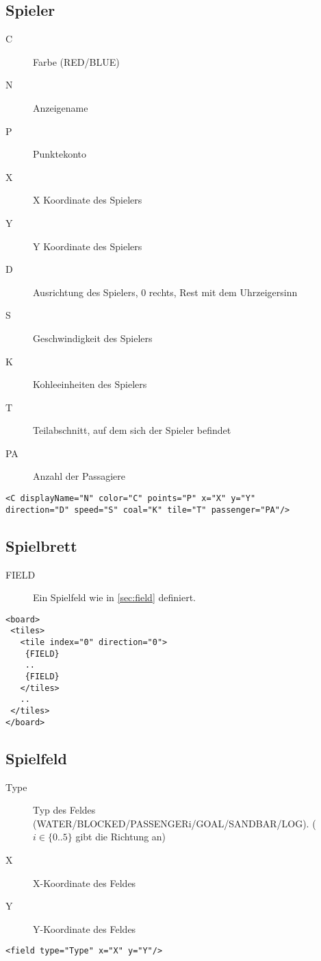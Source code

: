 \documentclass[12pt,a4paper, ngerman, oneside]{scrartcl}
\begin{document}
\subsection{\label{player}Spieler}
\begin{description}
\item[C] Farbe (RED/BLUE)
\item[N] Anzeigename
\item[P] Punktekonto
\item[X] X Koordinate des Spielers
\item[Y] Y Koordinate des Spielers
\item[D] Ausrichtung des Spielers, 0 rechts, Rest mit dem Uhrzeigersinn
\item[S] Geschwindigkeit des Spielers
\item[K] Kohleeinheiten des Spielers
\item[T] Teilabschnitt, auf dem sich der Spieler befindet
\item[PA] Anzahl der Passagiere
\end{description}
\begin{verbatim}
<C displayName="N" color="C" points="P" x="X" y="Y" 
direction="D" speed="S" coal="K" tile="T" passenger="PA"/>
\end{verbatim}


\subsection{\label{board}Spielbrett}
\begin{description}
\item[FIELD] Ein Spielfeld wie in \ref{sec:field} definiert.
\end{description}
\begin{verbatim}
<board>
 <tiles>
   <tile index="0" direction="0">
 	{FIELD}
 	..
 	{FIELD}
   </tiles>
   ..
 </tiles>
</board>
\end{verbatim}

\subsection{\label{sec:field}Spielfeld}
\begin{description}
\item[Type] Typ des Feldes (WATER/BLOCKED/PASSENGER{i}/GOAL/SANDBAR/LOG). ($i \in \{0..5\}$ gibt die Richtung an)
\item[X] X-Koordinate des Feldes
\item[Y] Y-Koordinate des Feldes
\end{description}
\begin{verbatim}
<field type="Type" x="X" y="Y"/>
\end{verbatim}
\end{document}
